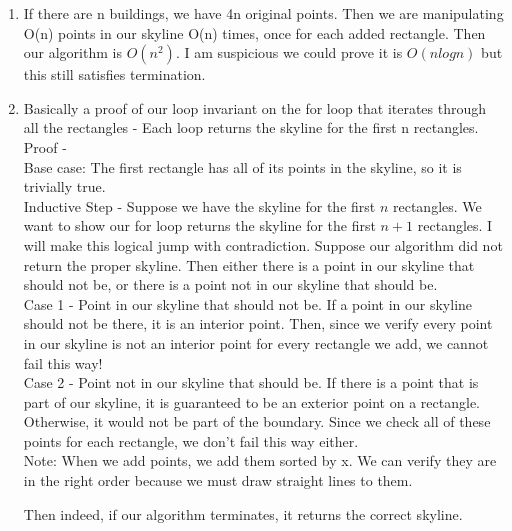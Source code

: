 \documentclass{article}
\begin{document}
\begin{enumerate}
\begin{algorithm}
\begin{algorithmic}[h]
		\end{algorithmic}
                \end{algorithm}
	\item  If there are n buildings, we have 4n original points. Then we are manipulating O(n) points in our skyline O(n) times, once for each added rectangle. Then our algorithm is $O(n^2)$. I am suspicious we could prove it is $O(nlogn)$ but this still satisfies termination.
	\item Basically a proof of our loop invariant on the for loop that iterates through all the rectangles - Each loop returns the skyline for the first n rectangles. Proof - \\
		Base case: The first rectangle has all of its points in the skyline, so it is trivially true. \\
		Inductive Step - Suppose we have the skyline for the first $n$ rectangles. We want to show our for loop returns the skyline for the first $n+1$ rectangles. I will make this logical jump with contradiction. Suppose our algorithm did not return the proper skyline. Then either there is a point in our skyline that should not be, or there is a point not in our skyline that should be. \\
		Case 1 - Point in our skyline that should not be. If a point in our skyline should not be there, it is an interior point. Then, since we verify every point in our skyline is not an interior point for every rectangle we add, we cannot fail this way!\\

		Case 2 - Point not in our skyline that should be. If there is a point that is part of our skyline, it is guaranteed to be an exterior point on a rectangle. Otherwise, it would not be part of the boundary. Since we check all of these points for each rectangle, we don't fail this way either.\\
		Note: When we add points, we add them sorted by x. We can verify they are in the right order because we must draw straight lines to them. 
		
		Then indeed, if our algorithm terminates, it returns the correct skyline.

        		
\end{enumerate}
\end{document}
